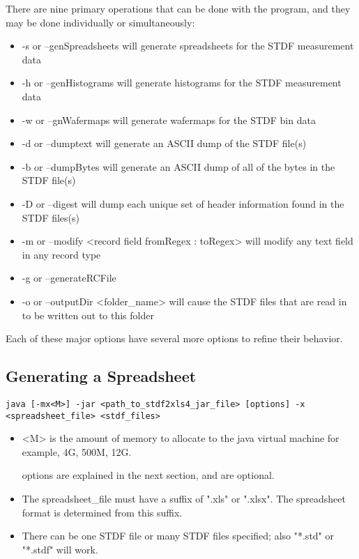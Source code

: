 \documentclass[letterpaper]{article}
\begin{document}
There are nine primary operations that can be done with the program, and they may be
done individually or simultaneously:
\begin{itemize}
\item -s or --genSpreadsheets will generate spreadsheets for the STDF measurement data
\item -h or --genHistograms will generate histograms for the STDF measurement data
\item -w or --gnWafermaps will generate wafermaps for the STDF bin data
\item -d or --dumptext will generate an ASCII dump of the STDF file(s)
\item -b or --dumpBytes will generate an ASCII dump of all of the bytes in the STDF file(s)
\item -D or --digest will dump each unique set of header information found in the STDF files(s)
\item -m or --modify <record field fromRegex : toRegex> will modify any text field in any record type 
\item -g or --generateRCFile
\item -o or --outputDir <folder\_name> will cause the STDF files that are read in to be written out to this folder
\end{itemize}

Each of these major options have several more options to refine their behavior.

\subsection{Generating a Spreadsheet}
\begin{verbatim}
java [-mx<M>] -jar <path_to_stdf2xls4_jar_file> [options] -x <spreadsheet_file> <stdf_files>
\end{verbatim}
\begin{itemize}
\item <M> is the amount of memory to allocate to the java virtual machine for example, 4G, 500M, 12G.
\item [options] are explained in the next section, and are optional.
\item The spreadsheet\_file must have a suffix of ".xls" or ".xlsx".  The spreadsheet format is
determined from this suffix.
\item There can be one STDF file or many STDF files specified; also "*.std" or "*.stdf" will work.
\end{itemize}
\end{document}

